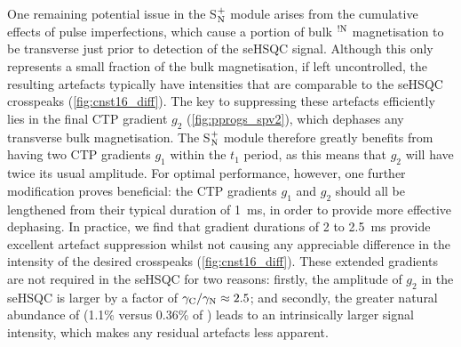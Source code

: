 \documentclass[11pt]{article}
\newcommand*{\noahSpn}{S$\rm ^+_N$}
\newcommand*{\carbon}{\ce{^{13}C}}
\newcommand*{\nitrogen}{\ce{^{15}N}}
\newcommand*{\magnnot}[1]{\ce{^1H}$^{!#1}$}
\begin{document}
\begin{refsection}
One remaining potential issue in the \noahSpn{} module arises from the cumulative effects of pulse imperfections, which cause a portion of bulk \magnnot{\ce{N}} magnetisation to be transverse just prior to detection of the seHSQC signal.
Although this only represents a small fraction of the bulk magnetisation, if left uncontrolled, the resulting artefacts typically have intensities that are comparable to the seHSQC crosspeaks (\cref{fig:cnst16_diff}).
The key to suppressing these artefacts efficiently lies in the final CTP gradient $g_2$ (\cref{fig:pprogs_spv2}), which dephases any transverse bulk magnetisation.
The \noahSpn{} module therefore greatly benefits from having two CTP gradients $g_1$ within the $t_1$ period, as this means that $g_2$ will have twice its usual amplitude.
For optimal performance, however, one further modification proves beneficial: the CTP gradients $g_1$ and $g_2$ should all be lengthened from their typical duration of \SI{1}{\ms}, in order to provide more effective dephasing.
In practice, we find that gradient durations of 2 to \SI{2.5}{\ms} provide excellent artefact suppression whilst not causing any appreciable difference in the intensity of the desired crosspeaks (\cref{fig:cnst16_diff}).
These extended gradients are not required in the \carbon{} seHSQC for two reasons: firstly, the amplitude of $g_2$ in the \carbon{} seHSQC is larger by a factor of $\gamma_{\ce{C}}/\gamma_{\ce{N}} \approx 2.5$; and secondly, the greater natural abundance of \carbon{} (1.1\% versus 0.36\% of \nitrogen{}) leads to an intrinsically larger signal intensity, which makes any residual artefacts less apparent.


\end{refsection}
\end{document}
